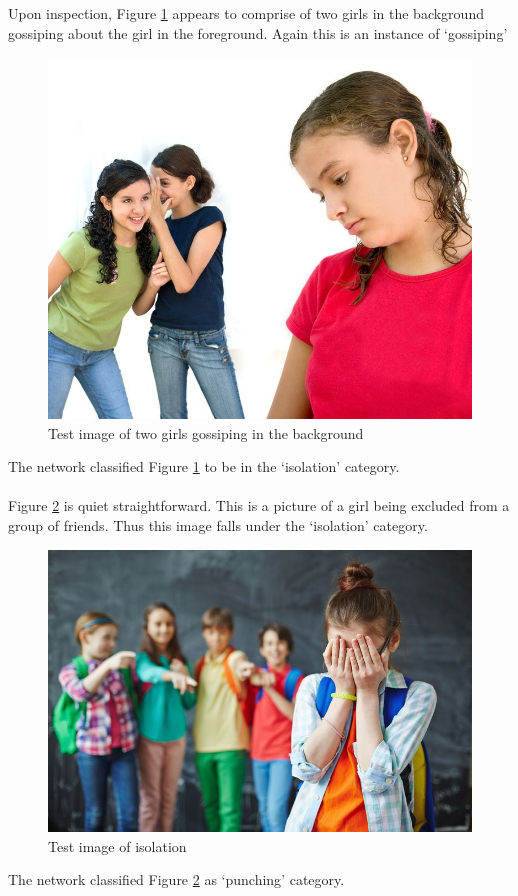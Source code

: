 \documentclass[12pt]{article}
\begin{document}
Upon inspection, Figure \ref{fig:gossip2} appears to comprise of two girls in the background gossiping about the girl in the foreground. Again this is an instance of \lq{gossiping}\rq{}
\begin{figure}[H]
\centering
  \includegraphics[width=.6\linewidth]{./Images/gossiping2.jpg}
  \caption{Test image of two girls gossiping in the background}
  \label{fig:gossip2}
\end{figure}
The network classified Figure \ref{fig:gossip2} to be in the \lq{isolation}\rq{} category. \\
\\

Figure \ref{fig:isolation} is quiet straightforward. This is a picture of a girl being excluded from a group of friends. Thus this image falls under the \lq{isolation}\rq{} category. \\
\begin{figure}[H]
\centering
  \includegraphics[width=.6\linewidth]{./Images/isolation1.jpg}
  \caption{Test image of isolation}
  \label{fig:isolation}
\end{figure}
The network classified Figure \ref{fig:isolation} as \lq{punching}\rq{} category. \\

\newpage
\end{document}
